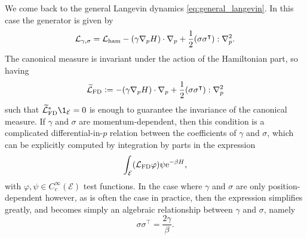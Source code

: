     \begin{remark}
        We come back to the general Langevin dynamics \eqref{eq:general_langevin}.
        In this case the generator is given by 
        \[\mathcal{L}_{\gamma,\sigma}=\mathcal{L}_{\rm ham}-(\gamma \nabla_p H)\cdot \nabla_p +\frac12(\sigma \sigma^\intercal) : \nabla_p^2.\]
        The canonical measure is invariant under the action of the Hamiltonian part, so having
        \[\widetilde{\mathcal{L}}_{\mathrm{FD}}\mathrel{\mathop:}= -(\gamma \nabla_p H)\cdot \nabla_p +\frac12(\sigma \sigma^\intercal) : \nabla_p^2 \]
        such that  $\widetilde{\cL}_{\mathrm{FD}}^*\1_\mathcal{E}=0$ is enough to guarantee the invariance of the canonical measure.
        If $\gamma$ and $\sigma$ are momentum-dependent, then this condition is a complicated differential-in-$p$ relation between the coefficients of $\gamma$ and $\sigma$, which can be explicitly computed by integration by parts in the expression
        \[\int_{\mathcal E} (\mathcal{L}_{\mathrm{FD}}\varphi)\psi\mathrm{e}^{-\beta H},\]
        with $\varphi, \psi \in C_c^\infty(\mathcal E)$ test functions. 
        In the case where $\gamma$ and $\sigma$ are only position-dependent however, as is often the case in practice, then the expression simplifies greatly, and becomes simply an algebraic relationship between $\gamma$ and $\sigma$, namely
        \begin{equation}
            \label{eq:general_fd_relation}
            \sigma \sigma^\intercal =\frac{2\gamma}{\beta}.
        \end{equation}
    \end{remark}

